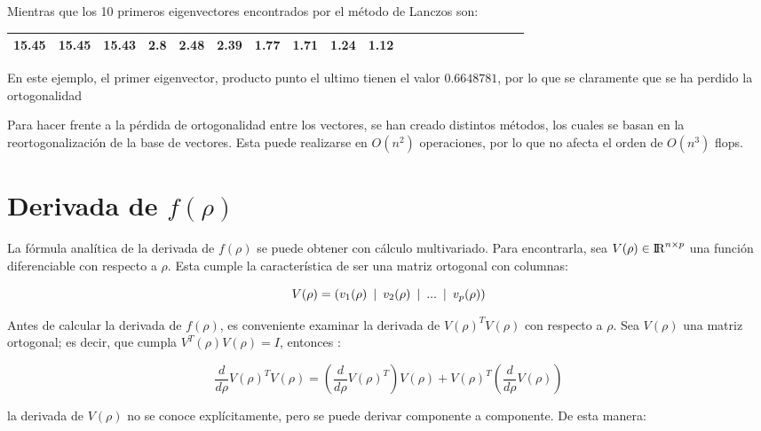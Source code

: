 \begin{example}
Mientras que los 10 primeros eigenvectores encontrados por el método de Lanczos son:
\begin{center}
\begin{tabular}{ | c | c|  c |c | c|  c |c | c|  c |c | c | c|  c |c | c|  c |c | c|  c |c |} 
\hline
15.45 & 15.45 & 15.43 & 2.8 & 2.48 & 2.39 & 1.77 & 1.71 & 1.24 & 1.12\\
\hline
\hline
\end{tabular}
\end{center}

En este ejemplo, el primer eigenvector, producto punto el ultimo tienen el valor $0.6648781$, por lo que se claramente que se ha perdido la ortogonalidad

\end{example}

Para hacer frente a la pérdida de ortogonalidad entre los vectores, se han creado distintos métodos, los cuales se basan en la reortogonalización de la base de vectores. \cite{demmel1997applied} Esta puede realizarse en $O(n^2)$ operaciones, por lo que no afecta el orden de $O(n^3)$ flops.

\section{Derivada de $f(\rho)$}

La fórmula analítica de la derivada de $f(\rho)$ se puede obtener con cálculo multivariado. Para encontrarla, sea $V(\rho) \in {\rm I\!R}^{n \times p}$ una función diferenciable con respecto a $\rho$. Esta cumple la característica de ser una matriz ortogonal con columnas:

\begin{equation*}
	V(\rho) = (v_1(\rho) \enskip|\enskip v_2(\rho) \enskip|\enskip ... \enskip|\enskip v_p(\rho))
\end{equation*}

Antes de calcular la derivada de $f(\rho)$, es conveniente examinar la derivada de $V(\rho)^T V(\rho)$ con respecto a $\rho$. Sea $V(\rho)$ una matriz ortogonal; es decir, que cumpla $V^T(\rho) V(\rho) = I$, entonces \cite{ngo2012trace}:

\begin{equation*}
\frac{d}{d\rho} V(\rho)^T V(\rho) = \left(\frac{d}{d\rho}V(\rho)^T\right) V(\rho)  + V(\rho)^T 	\left( \frac{d}{d\rho} V(\rho) \right)
\end{equation*}

la derivada de $V(\rho)$ no se conoce explícitamente, pero se puede derivar componente a componente. De esta manera:


